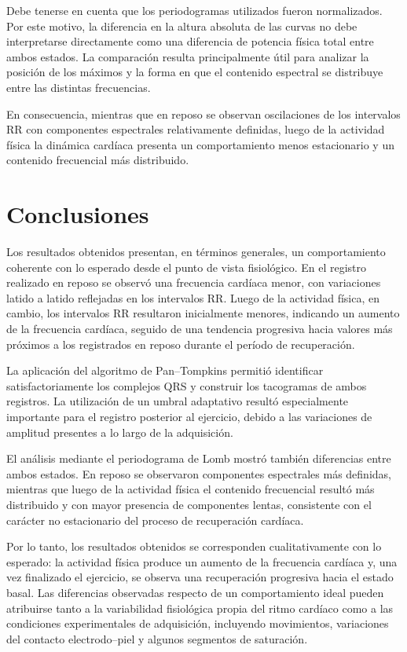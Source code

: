 \documentclass[12pt,a4paper]{article}
\begin{document}
Debe tenerse en cuenta que los periodogramas utilizados fueron normalizados.
Por este motivo, la diferencia en la altura absoluta de las curvas no debe
interpretarse directamente como una diferencia de potencia física total entre
ambos estados. La comparación resulta principalmente útil para analizar la
posición de los máximos y la forma en que el contenido espectral se distribuye
entre las distintas frecuencias.

En consecuencia, mientras que en reposo se observan oscilaciones de los
intervalos RR con componentes espectrales relativamente definidas, luego de la
actividad física la dinámica cardíaca presenta un comportamiento menos
estacionario y un contenido frecuencial más distribuido.


\section{Conclusiones}

Los resultados obtenidos presentan, en términos generales, un comportamiento
coherente con lo esperado desde el punto de vista fisiológico. En el registro
realizado en reposo se observó una frecuencia cardíaca menor, con variaciones
latido a latido reflejadas en los intervalos RR. Luego de la actividad física,
en cambio, los intervalos RR resultaron inicialmente menores, indicando un
aumento de la frecuencia cardíaca, seguido de una tendencia progresiva hacia
valores más próximos a los registrados en reposo durante el período de
recuperación.

La aplicación del algoritmo de Pan--Tompkins permitió identificar
satisfactoriamente los complejos QRS y construir los tacogramas de ambos
registros. La utilización de un umbral adaptativo resultó especialmente
importante para el registro posterior al ejercicio, debido a las variaciones
de amplitud presentes a lo largo de la adquisición.

El análisis mediante el periodograma de Lomb mostró también diferencias entre
ambos estados. En reposo se observaron componentes espectrales más definidas,
mientras que luego de la actividad física el contenido frecuencial resultó más
distribuido y con mayor presencia de componentes lentas, consistente con el
carácter no estacionario del proceso de recuperación cardíaca.

Por lo tanto, los resultados obtenidos se corresponden cualitativamente con lo
esperado: la actividad física produce un aumento de la frecuencia cardíaca y,
una vez finalizado el ejercicio, se observa una recuperación progresiva hacia
el estado basal. Las diferencias observadas respecto de un comportamiento
ideal pueden atribuirse tanto a la variabilidad fisiológica propia del ritmo
cardíaco como a las condiciones experimentales de adquisición, incluyendo
movimientos, variaciones del contacto electrodo--piel y algunos segmentos de
saturación.
\end{document}

